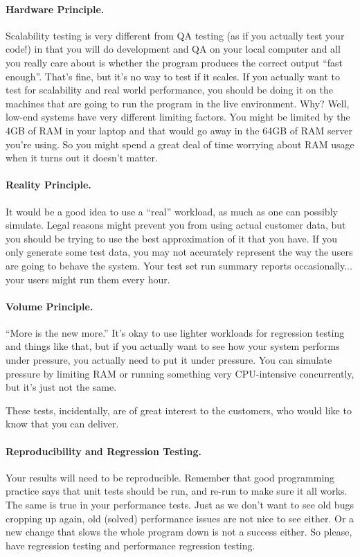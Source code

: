 \documentclass[a4paper]{report}
\begin{document}
\paragraph{Hardware Principle.} 
Scalability testing is very different from  QA testing (as if you actually test your code!) in that you will do development and QA on your local computer and all you really care about is whether the program produces the correct output ``fast enough''. That's fine, but it's no way to test if it scales. If you actually want to test for scalability and real world performance, you should be doing it on the machines that are going to run the program in the live environment. Why? Well, low-end systems have very different limiting factors. You might be limited by the 4GB of RAM in your laptop and that would go away in the 64GB of RAM server you're using. So you might spend a great deal of time worrying about RAM usage when it turns out it doesn't matter.

\paragraph{Reality Principle.}
It would be a good idea to use a ``real'' workload, as much as one can possibly simulate. Legal reasons might prevent you from using actual customer data, but you should be trying to use the best approximation of it that you have. If you only generate some test data, you may not accurately represent the way the users are going to behave the system. Your test set run summary reports occasionally... your users might run them every hour. 

\paragraph{Volume Principle.}
``More is the new more.'' It's okay to use lighter workloads for regression testing and things like that, but if you actually want to see how your system performs under pressure, you actually need to put it under pressure. You can simulate pressure by limiting RAM or running something very CPU-intensive concurrently, but it's just not the same.

These tests, incidentally, are of great interest to the customers, who would like to know that you can deliver. 

\paragraph{Reproducibility and Regression Testing.}
Your results will need to be reproducible. Remember that good programming practice says that unit tests should be run, and re-run to make sure it all works. The same is true in your performance tests. Just as we don't want to see old bugs cropping up again, old (solved) performance issues are not nice to see either. Or a new change that slows the whole program down is not a success either. So please, have regression testing and performance regression testing.
\end{document}

